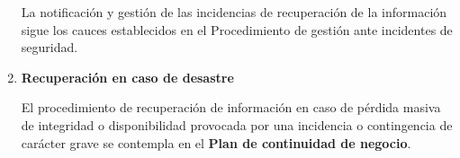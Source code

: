 \begin{enumerate}[label=\alph*)]
La notificación y gestión de las incidencias de recuperación de la información sigue los cauces establecidos en el Procedimiento de gestión ante incidentes de seguridad.

\item \textbf{Recuperación en caso de desastre}

El procedimiento de recuperación de información en caso de pérdida masiva de integridad o disponibilidad provocada por una incidencia o contingencia de carácter grave se contempla en el \textbf{Plan de continuidad de negocio}.

\end{enumerate}